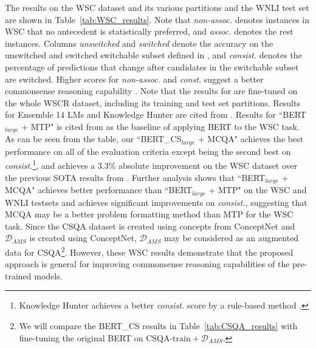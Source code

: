\documentclass[11pt,a4paper]{article}
\begin{document}
The results on the WSC dataset and its various partitions and the WNLI test set are shown in Table~\ref{tab:WSC_results}. Note that \emph{non-assoc.} denotes instances in WSC that no antecedent is statistically preferred, and \emph{assoc.} denotes the rest instances. Columns \emph{unswitched} and \emph{switched} denote the accuracy on the unswitched and switched switchable subset defined in \citep{trichelair-etal-2019-reasonable}, and \emph{consist.} denotes the percentage of predictions that change after candidates in the switchable subset are switched. 
Higher scores for \emph{non-assoc.} and \emph{const.} suggest a better commonsense reasoning capability \citep{trichelair-etal-2019-reasonable}.
Note that the results for \citet{ruan2019exploring} are fine-tuned on the whole WSCR dataset, including its training and test set partitions.
Results for Ensemble 14 LMs \citep{trinh2018simple} and Knowledge Hunter\citep{emami2018knowledge} are cited from \citet{trichelair-etal-2019-reasonable}.
Results for ``BERT$_{large}$ + MTP" is cited from \citet{kocijan2019surprisingly} as the baseline of applying BERT to the WSC task. 
As can be seen from the table, our ``BERT\_CS$_{large}$ + MCQA" achieves the best performance on all of the evaluation criteria except being the second best on \emph{consist.}\footnote{Knowledge Hunter achieves a better \emph{consist.} score by a rule-based method \citep{trichelair-etal-2019-reasonable}.}, and achieves a 3.3\% absolute improvement on the WSC dataset over the previous SOTA results from \citet{kocijan2019surprisingly}. Further analysis shows that ``BERT$_{large}$ + MCQA" achieves better performance than ``BERT$_{large}$ + MTP" on the WSC and WNLI testsets and achieves significant improvements on \emph{consist.}, suggesting that MCQA may be a better problem formatting method than MTP for the WSC task. Since the CSQA dataset is created using concepts from ConceptNet and $\mathcal{D}_{AMS}$ is created using ConceptNet, $\mathcal{D}_{AMS}$ may be considered as an augmented data for CSQA\footnote{We will compare the BERT\_CS results in Table~\ref{tab:CSQA_results} with fine-tuning the original BERT on $\textrm{CSQA-train}+\mathcal{D}_{AMS}$.}. However, these WSC results demonstrate that the proposed approach is general for improving commonsense reasoning capabilities of the pre-trained models.
\end{document}
